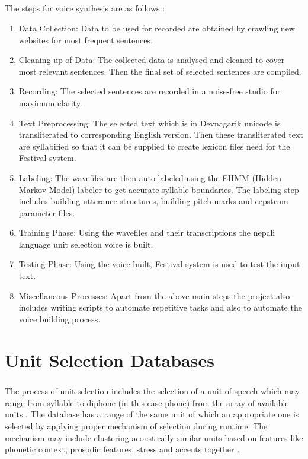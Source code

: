\documentclass{report}
\begin{document}
		\paragraph{}
			The steps for voice synthesis are as follows \cite{HINDITTS:5}:
			\begin{enumerate}
				\item{Data Collection}: Data to be used for recorded are obtained by crawling new websites for most frequent sentences.
				\item{Cleaning up of Data}: The collected data is analysed and cleaned to cover most relevant sentences. Then the final set of selected sentences are compiled.
				\item{Recording}: The selected sentences are recorded in a noise-free studio for maximum clarity.
				\item{Text Preprocessing}: The selected text which is in Devnagarik unicode is transliterated to corresponding English version. Then these transliterated text are syllabified so that it can be supplied to create lexicon files need for the Festival system.
				\item{Labeling}: The wavefiles are then auto labeled using the EHMM (Hidden Markov Model) labeler to get accurate syllable boundaries. The labeling step includes building utterance structures, building pitch marks and cepstrum parameter files.
				\item{Training Phase}: Using the wavefiles and their transcriptions the nepali language unit selection voice is built.
				\item{Testing Phase}: Using the voice built, Festival system is used to test the input text.
				\item{Miscellaneous Processes}: Apart from the above main steps the project also includes writing scripts to automate repetitive tasks and also to automate the voice building process. 
	
			\end{enumerate} 

	\chapter{Unit Selection Databases}
		\paragraph{}
			The process of unit selection includes the selection of a unit of speech which may range from syllable to diphone (in this case phone) from the array of available units \cite{BSV:6}. The database has a range of the same unit of which an appropriate one is selected by applying proper mechanism of selection during runtime. The mechanism may include clustering acoustically similar units based on features like phonetic context, prosodic features, stress and accents together \cite{BSV:6}. 
\end{document}
